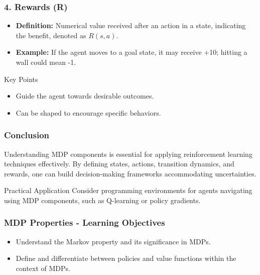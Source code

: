 \documentclass[aspectratio=169]{beamer}
\begin{document}
\begin{frame}[fragile]
    \frametitle{4. Rewards (R)}
    \begin{itemize}
        \item \textbf{Definition:} Numerical value received after an action in a state, indicating the benefit, denoted as \( R(s, a) \).
        \item \textbf{Example:} If the agent moves to a goal state, it may receive +10; hitting a wall could mean -1.
    \end{itemize}

    \begin{block}{Key Points}
        \begin{itemize}
            \item Guide the agent towards desirable outcomes.
            \item Can be shaped to encourage specific behaviors.
        \end{itemize}
    \end{block}
\end{frame}

\begin{frame}[fragile]
    \frametitle{Conclusion}
    Understanding MDP components is essential for applying reinforcement learning techniques effectively. By defining states, actions, transition dynamics, and rewards, one can build decision-making frameworks accommodating uncertainties.

    \begin{block}{Practical Application}
        Consider programming environments for agents navigating using MDP components, such as Q-learning or policy gradients.
    \end{block}
\end{frame}

\begin{frame}[fragile]
    \titlepage
\end{frame}

\begin{frame}[fragile]
    \frametitle{MDP Properties - Learning Objectives}
    \begin{itemize}
        \item Understand the Markov property and its significance in MDPs.
        \item Define and differentiate between policies and value functions within the context of MDPs.
    \end{itemize}
\end{frame}
\end{document}
